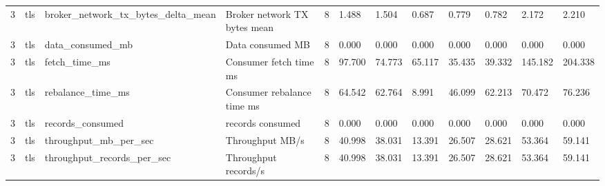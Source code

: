 \begin{longtable}{llllllllllll}
3 & tls & broker\_network\_tx\_bytes\_delta\_mean & Broker network TX bytes mean & 8 & 1.488 & 1.504 & 0.687 & 0.779 & 0.782 & 2.172 & 2.210 \\
3 & tls & data\_consumed\_mb & Data consumed MB & 8 & 0.000 & 0.000 & 0.000 & 0.000 & 0.000 & 0.000 & 0.000 \\
3 & tls & fetch\_time\_ms & Consumer fetch time ms & 8 & 97.700 & 74.773 & 65.117 & 35.435 & 39.332 & 145.182 & 204.338 \\
3 & tls & rebalance\_time\_ms & Consumer rebalance time ms & 8 & 64.542 & 62.764 & 8.991 & 46.099 & 62.213 & 70.472 & 76.236 \\
3 & tls & records\_consumed & records consumed & 8 & 0.000 & 0.000 & 0.000 & 0.000 & 0.000 & 0.000 & 0.000 \\
3 & tls & throughput\_mb\_per\_sec & Throughput MB/s & 8 & 40.998 & 38.031 & 13.391 & 26.507 & 28.621 & 53.364 & 59.141 \\
3 & tls & throughput\_records\_per\_sec & Throughput records/s & 8 & 40.998 & 38.031 & 13.391 & 26.507 & 28.621 & 53.364 & 59.141 \\
\hline
\end{longtable}
